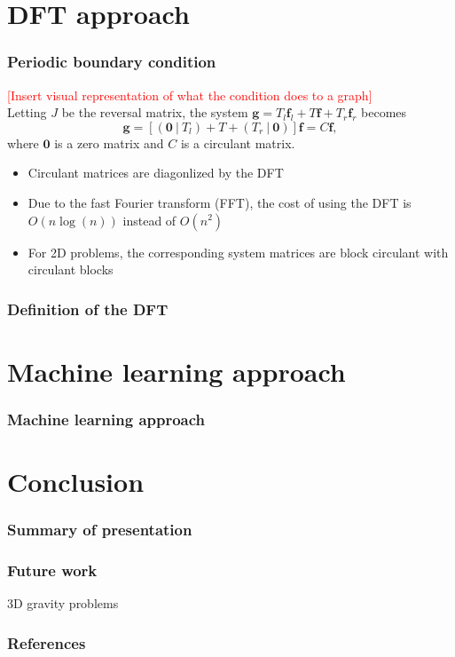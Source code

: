 \documentclass{beamer}
\newcommand{\ToDo}[1]{\textcolor{red}{[#1]}}
\newcommand{\gVec}{\mathbf{g}}	%
\newcommand{\fVec}{\mathbf{f}}	%
\begin{document}
\section{DFT approach}

\begin{frame}
\frametitle{Periodic boundary condition}
\ToDo{Insert visual representation of what the condition does to a graph} \\
Letting $J$ be the reversal matrix, the system $\gVec = T_{l}\fVec_{l} + T\fVec + T_{r}\fVec_{r}$ becomes
\[\gVec = [(\mathbf{0}~|~T_{l}) + T + (T_{r}~|~\mathbf{0})]\fVec = C\fVec,\]
where $\mathbf{0}$ is a zero matrix and $C$ is a circulant matrix.
\begin{itemize}
\item Circulant matrices are diagonlized by the DFT
\item Due to the fast Fourier transform (FFT), the cost of using the DFT is $O(n\log(n))$ instead of $O(n^2)$ \cite{CooleyTukey}
\item For 2D problems, the corresponding system matrices are block circulant with circulant blocks
\end{itemize}
\end{frame}

\begin{frame}
\frametitle{Definition of the DFT}

\end{frame}

\section{Machine learning approach}

\begin{frame}
\frametitle{Machine learning approach}

\end{frame}

\section{Conclusion}

\begin{frame}
\frametitle{Summary of presentation}

\end{frame}

\begin{frame}
\frametitle{Future work}
3D gravity problems
\end{frame}

\begin{frame}[allowframebreaks]
\frametitle{References}


\end{frame}
\end{document}

